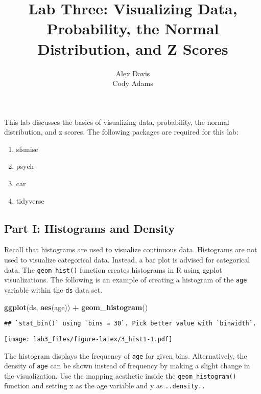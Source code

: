 \documentclass[]{article}
\title{Lab Three: Visualizing Data, Probability, the Normal Distribution, and Z
Scores}
\author{Alex Davis \\ Cody Adams}
\date{}
\newenvironment{Shaded}{\begin{snugshade}}{\end{snugshade}}
\newcommand{\KeywordTok}[1]{\textcolor[rgb]{0.13,0.29,0.53}{\textbf{#1}}}
\newcommand{\StringTok}[1]{\textcolor[rgb]{0.31,0.60,0.02}{#1}}
\newcommand{\OperatorTok}[1]{\textcolor[rgb]{0.81,0.36,0.00}{\textbf{#1}}}
\newcommand{\NormalTok}[1]{#1}
\providecommand{\tightlist}{%
  \setlength{\itemsep}{0pt}\setlength{\parskip}{0pt}}
\begin{document}
\maketitle

This lab discusses the basics of visualizing data, probability, the
normal distribution, and z scores. The following packages are required
for this lab:

\begin{enumerate}
\def\labelenumi{\arabic{enumi}.}
\tightlist
\item
  sfsmisc
\item
  psych
\item
  car
\item
  tidyverse
\end{enumerate}

\subsection{Part I: Histograms and
Density}\label{part-i-histograms-and-density}

Recall that histograms are used to visualize continuous data. Histograms
are not used to visualize categorical data. Instead, a bar plot is
advised for categorical data. The \texttt{geom\_hist()} function creates
histograms in R using ggplot visualizations. The following is an example
of creating a histogram of the \texttt{age} variable within the
\texttt{ds} data set.

\begin{Shaded}
\begin{Highlighting}[]
\KeywordTok{ggplot}\NormalTok{(ds, }\KeywordTok{aes}\NormalTok{(age)) }\OperatorTok{+}
\StringTok{  }\KeywordTok{geom_histogram}\NormalTok{()}
\end{Highlighting}
\end{Shaded}

\begin{verbatim}
## `stat_bin()` using `bins = 30`. Pick better value with `binwidth`.
\end{verbatim}

\texttt{[image: lab3\_files/figure-latex/3\_hist1-1.pdf]}

The histogram displays the frequency of \texttt{age} for given bins.
Alternatively, the density of \texttt{age} can be shown instead of
frequency by making a slight change in the visualization. Use the
mapping aesthetic inside the \texttt{geom\_histogram()} function and
setting x as the age variable and y as \texttt{..density..}
\end{document}
